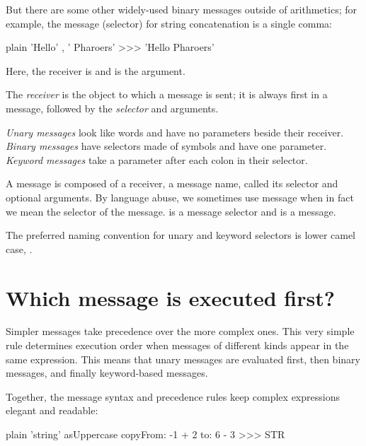\documentclass[10pt,twoside,english]{_support/latex/sbabook/sbabook}
\begin{document}
But there are some other widely-used binary messages outside of arithmetics; for example, the message (selector) for string concatenation is a single comma:

\begin{displaycode}{plain}
'Hello' , ' Pharoers'
>>> 'Hello Pharoers'
\end{displaycode}

Here, the receiver is  and  is the argument.

\begin{coffee}
The \textit{receiver} is the object to which a message is sent; it is always first in a message, followed by the \textit{selector} and arguments.
\end{coffee}

\begin{coffee}
\textit{Unary messages} look like words and have no parameters beside their receiver. \textit{Binary messages} have selectors made of symbols and have one parameter. \textit{Keyword messages} take a parameter after each colon in their selector.
\end{coffee}

\begin{coffee}
A message is composed of a receiver, a message name, called its selector and optional arguments. By language abuse, we sometimes use message when in fact we mean the selector of the message. \textcode{,} is a message selector and  is a message. 
\end{coffee}

\begin{coffee}
The preferred naming convention for unary and keyword selectors is lower camel case, .
\end{coffee}
\section{Which message is executed first?}
Simpler messages take precedence over the more complex ones.
This very simple rule determines execution order when messages of different kinds appear in the same expression.
This means that unary messages are evaluated first, then binary messages, and finally keyword-based messages.

Together, the message syntax and precedence rules keep complex expressions elegant and readable:

\begin{displaycode}{plain}
'string' asUppercase copyFrom: -1 + 2 to: 6 - 3
>>> STR
\end{displaycode}
\end{document}

